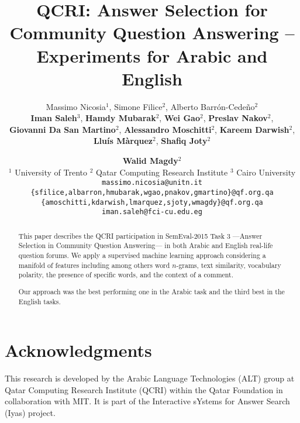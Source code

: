 \documentclass[11pt,letterpaper]{article}
\title{%
QCRI: Answer Selection for Community Question Answering -- \\ Experiments for 
Arabic and English
}
\author{%
Massimo Nicosia$^1$, Simone Filice$^2$, Alberto Barr\'on-Cede\~no$^2$  \\
{\bf Iman Saleh}$^3$, {\bf Hamdy Mubarak}$^2$, {\bf Wei Gao$^2$}, 
{\bf Preslav Nakov$^2$}, \\
{\bf Giovanni Da San Martino$^2$}, {\bf Alessandro Moschitti}$^2$,
{\bf Kareem Darwish$^2$}, \\ 
{\bf Llu\'is M\`arquez$^2$}, {\bf Shafiq Joty$^2$} \and {\bf Walid Magdy$^2$} 
\\
$^1$ University of Trento \hspace{1em}
$^2$ Qatar Computing Research Institute	\hspace{1em}
$^3$ Cairo University \\
\small
{\tt massimo.nicosia@unitn.it}	\\
\small
{\tt \{sfilice,albarron,hmubarak,wgao,pnakov,gmartino\}@qf.org.qa} 	\\
\small
{\tt \{amoschitti,kdarwish,lmarquez,sjoty,wmagdy\}@qf.org.qa}	\\
\small
{\tt iman.saleh@fci-cu.edu.eg}
% 
% 
% 
% 
% 
}
\date{}
\begin{document}
\maketitle
\begin{abstract}
This paper describes the QCRI participation in SemEval-2015 Task 3 ---Answer 
Selection in Community Question Answering--- in both Arabic and English 
real-life question forums. We apply a supervised machine learning approach 
considering a manifold of features including among others word $n$-grams, text 
similarity, vocabulary polarity, the presence of specific words, and the context 
of a comment.

Our approach was the best performing one in the Arabic task and the third 
best in the English tasks.
\end{abstract}


% 






\section*{Acknowledgments}

This research is developed by the Arabic Language Technologies (ALT) group at Qatar Computing Research Institute (QCRI) within the Qatar Foundation in collaboration with MIT. It is part of the Interactive sYstems for Answer Search (Iyas) project.






% 
% 
% 
% 

\end{document}
